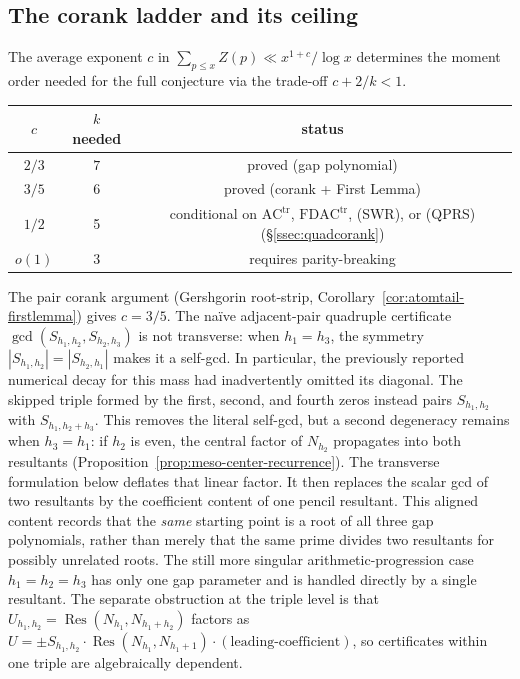 \subsection{The corank ladder and its ceiling}

The average exponent $c$ in $\sum_{p \le x} Z(p) \ll x^{1+c}/\log x$
determines the moment order needed for the full conjecture via the
trade-off $c + 2/k < 1$.

\begin{center}
\begin{tabular}{ccc}
\toprule
$c$ & $k$ needed & status \\
\midrule
$2/3$ & $7$ & proved (gap polynomial) \\
$3/5$ & $6$ & proved (corank + First Lemma) \\
$1/2$ & 5 & conditional on $\mathrm{AC}^{\mathrm{tr}}$,
$\mathrm{FDAC}^{\mathrm{tr}}$, \textup{(SWR)}, or \textup{(QPRS)}
(\S\ref{ssec:quadcorank}) \\
$o(1)$ & $3$ & requires parity-breaking \\
\bottomrule
\end{tabular}
\end{center}

The pair corank argument (Gershgorin root-strip,
Corollary~\ref{cor:atomtail-firstlemma}) gives $c = 3/5$.
The na\"ive adjacent-pair quadruple certificate
$\gcd(S_{h_1,h_2},S_{h_2,h_3})$ is not transverse: when
$h_1=h_3$, the symmetry
$|S_{h_1,h_2}|=|S_{h_2,h_1}|$ makes it a self-gcd.  In
particular, the previously reported numerical decay for this mass
had inadvertently omitted its diagonal.  The skipped triple formed by
the first, second, and fourth zeros instead pairs
$S_{h_1,h_2}$ with $S_{h_1,h_2+h_3}$.  This removes the literal
self-gcd, but a second degeneracy remains when $h_3=h_1$: if $h_2$
is even, the central factor of $N_{h_2}$ propagates into both
resultants (Proposition~\ref{prop:meso-center-recurrence}).  The
transverse formulation below deflates that linear factor.  It then
replaces the scalar gcd of two resultants by the coefficient content of
one pencil resultant.  This aligned content records that the \emph{same}
starting point is a root of all three gap polynomials, rather than merely
that the same prime divides two resultants for possibly unrelated roots.
The still more singular arithmetic-progression case
$h_1=h_2=h_3$ has only one gap parameter and is handled directly by a
single resultant.
The separate obstruction at the triple level is that
$U_{h_1,h_2}
= \operatorname{Res}(N_{h_1}, N_{h_1+h_2})$ factors as
$U = \pm S_{h_1,h_2} \cdot \operatorname{Res}(N_{h_1}, N_{h_1+1})
\cdot (\text{leading-coefficient})$,
so certificates within one triple are algebraically dependent.

